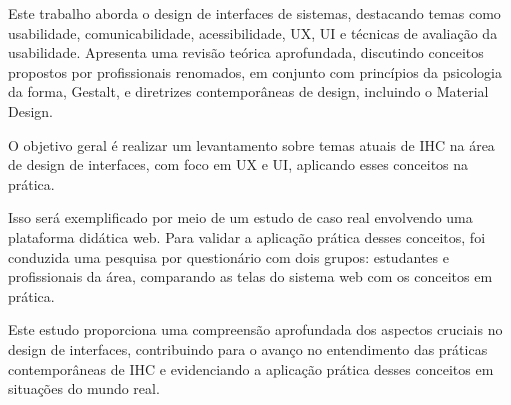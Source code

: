 \documentclass{bsimc}
\begin{document}

	
	\begin{resumo}
 
Este trabalho aborda o design de interfaces de sistemas, destacando temas como usabilidade, comunicabilidade, acessibilidade, \ac{UX}, \ac{UI} e técnicas de avaliação da usabilidade. Apresenta uma revisão teórica aprofundada, discutindo conceitos propostos por profissionais renomados, em conjunto com princípios da psicologia da forma, Gestalt, e diretrizes contemporâneas de design, incluindo o Material Design.

O objetivo geral é realizar um levantamento sobre temas atuais de \ac{IHC} na área de design de interfaces, com foco em \ac{UX} e \ac{UI}, aplicando esses conceitos na prática.

Isso será exemplificado por meio de um estudo de caso real envolvendo uma plataforma didática web. Para validar a aplicação prática desses conceitos, foi conduzida uma pesquisa por questionário com dois grupos: estudantes e profissionais da área, comparando as telas do sistema web com os conceitos em prática.

Este estudo proporciona uma compreensão aprofundada dos aspectos cruciais no design de interfaces, contribuindo para o avanço no entendimento das práticas contemporâneas de \ac{IHC} e evidenciando a aplicação prática desses conceitos em situações do mundo real.



    
    
    

\end{resumo}
\end{document}
